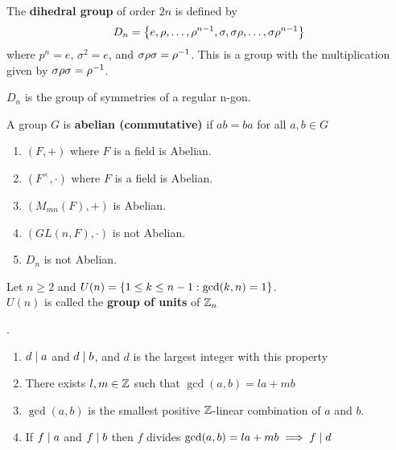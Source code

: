 \begin{definition}
    The \textbf{dihedral group} of order $2n$ is defined by $$D_n = \left\{e, \rho, \dots, \rho^{n-1}, \sigma, \sigma\rho, \dots, \sigma\rho^{n - 1}\right\}$$ where $p^n = e$, $\sigma^2 = e$, and $\sigma\rho\sigma = \rho^{-1}$.
    This is a group with the multiplication given by $\sigma\rho\sigma = \rho^{-1}$.
\end{definition}

\begin{remark}
    $D_n$ is the group of symmetries of a regular n-gon.
\end{remark}

\begin{definition}
    A group $G$ is \textbf{abelian (commutative)} if $ab=ba$ for all $a, b \in G$
\end{definition}

\begin{example}
    \spacebeforelist
    \begin{enumerate}
        \item $(F, +)$ where $F$ is a field is Abelian.
        \item $(F^\times, \cdot)$ where $F$ is a field is Abelian.
        \item $(M_{mn}(F), +)$ is Abelian.
        \item $(GL(n, F), \cdot)$ is not Abelian.
        \item $D_n$ is not Abelian.
    \end{enumerate}
\end{example}

\begin{definition}
    Let $n \geq 2$ and $U(n) = \left\{1 \leq k \leq n-1: \gcd (k,n) = 1\right\}$. \\
    $U(n)$ is called the \textbf{group of units} of $\mathbb{Z}_n$
\end{definition}

\begin{recall}[Facts about $d = \gcd (a,b)$]
    .
    \begin{enumerate}
        \item $d \mid a$ and $d \mid b$, and $d$ is the largest integer with this property
        \item There exists $l, m \in \mathbb{Z}$ such that $\gcd (a,b) = la + mb$
        \item $\gcd (a,b)$ is the smallest positive $\mathbb{Z}$-linear combination of $a$ and $b$.
        \item If $f \mid a$ and $f \mid b$ then $f$ divides $\gcd (a,b) = la + mb \implies f \mid d$
    \end{enumerate}
\end{recall}

